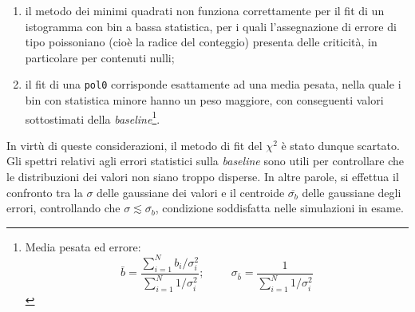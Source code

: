 \documentclass[10pt, oneside, a4paper]{article}   	%
\begin{document}
\begin{enumerate}
 \item il metodo dei minimi quadrati non funziona correttamente per il fit di un istogramma con bin a bassa statistica, per i quali l'assegnazione di errore di tipo poissoniano (cioè la radice del conteggio) presenta delle criticità, in particolare per contenuti nulli;
 \item il fit di una \lstinline{pol0} corrisponde esattamente ad una media pesata, nella quale i bin con statistica minore hanno un peso maggiore, con conseguenti valori sottostimati della \textit{baseline}\footnote{Media pesata ed errore:
$$\bar{b}=\frac{\sum_{i=1}^N b_i/\sigma_i^2}{\sum_{i=1}^N 1/\sigma_i^2};
\hspace{1cm} \sigma_{\bar{b}}=\frac{1}{\sum_{i=1}^N1/\sigma_i^2}$$}.
 
\end{enumerate}
In virtù di queste considerazioni, il metodo di fit del $\chi^2$ è stato dunque scartato. 
Gli spettri relativi agli errori statistici sulla \textit{baseline} sono utili per controllare che le distribuzioni dei valori non siano troppo disperse. In altre parole, si effettua il confronto tra la $\sigma$ delle gaussiane dei valori e il centroide $\overline{\sigma_{b}}$ delle gaussiane degli errori, controllando che $\sigma\lesssim \overline{\sigma_{b}}$, condizione soddisfatta nelle simulazioni in esame.
%
\end{document}
